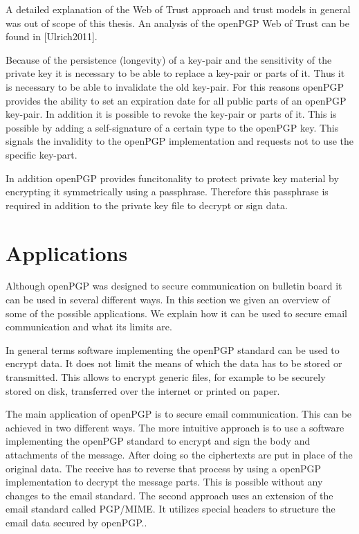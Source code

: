 A detailed explanation of the Web of Trust approach and trust models in general was out of scope of this thesis. An analysis of the openPGP Web of Trust can be found in [Ulrich2011].


Because of the persistence (longevity) of a key-pair and the sensitivity of the private key it is necessary to be able to replace a key-pair or parts of it. Thus it is necessary to be able to invalidate the old key-pair. For this reasons openPGP provides the ability to set an expiration date for all public parts of an openPGP key-pair. In addition it is possible to revoke the key-pair or parts of it. This is possible by adding a self-signature of a certain type to the openPGP key. This signals the invalidity to the openPGP implementation and requests not to use the specific key-part.

In addition openPGP provides funcitonality to protect private key material by encrypting it symmetrically using a passphrase. Therefore this passphrase is required in addition to the private key file to decrypt or sign data.

\section{Applications} \label{section:openpgp:smime}

Although openPGP was designed to secure communication on bulletin board it can be used in several different ways. In this section we given an overview of some of the possible applications. We explain how it can be used to secure email communication and what its limits are. 


In general terms software implementing the openPGP standard can be used to encrypt data. It does not limit the means of which the data has to be stored or transmitted. This allows to encrypt generic files, for example to be securely stored on disk, transferred over the internet or printed on paper.  


The main application of openPGP is to secure email communication. This can be achieved in two different ways. The more intuitive approach is to use a software implementing the openPGP standard to encrypt and sign the body and attachments of the message. After doing so the ciphertexts are put in place of the original data. The receive has to reverse that process by using a openPGP implementation to decrypt the message parts. This is possible without any changes to the email standard. The second approach uses an extension of the email standard called PGP/MIME. It utilizes special headers to structure the email data secured by openPGP..


